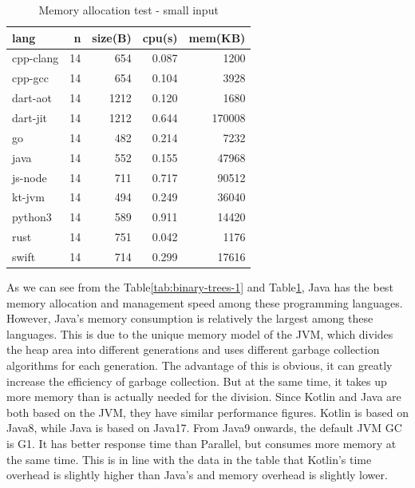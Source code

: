 \begin{table}[htbp]
    \caption{Memory allocation test - small input}
    \label{tab:binary-trees-2}
    \begin{center}
        \begin{tabular}{lrrrr}
            \toprule
            lang      & n  & size(B) & cpu(s) & mem(KB) \\
            \midrule
            cpp-clang & 14 & 654     & 0.087  & 1200    \\
            cpp-gcc   & 14 & 654     & 0.104  & 3928    \\
            dart-aot  & 14 & 1212    & 0.120  & 1680    \\
            dart-jit  & 14 & 1212    & 0.644  & 170008  \\
            go        & 14 & 482     & 0.214  & 7232    \\
            java      & 14 & 552     & 0.155  & 47968   \\
            js-node   & 14 & 711     & 0.717  & 90512   \\
            kt-jvm    & 14 & 494     & 0.249  & 36040   \\
            python3   & 14 & 589     & 0.911  & 14420   \\
            rust      & 14 & 751     & 0.042  & 1176    \\
            swift     & 14 & 714     & 0.299  & 17616   \\
            \bottomrule
        \end{tabular}
    \end{center}
\end{table}

As we can see from the Table\ref{tab:binary-trees-1} and Table\ref{tab:binary-trees-2},
Java has the best memory allocation and management
speed among these programming languages.
However, Java's memory consumption is relatively the largest among these languages.
This is due to the unique memory model of the JVM, which divides the heap area into
different generations and uses different garbage collection algorithms for each generation.
The advantage of this is obvious, it can greatly increase the efficiency of garbage
collection. But at the same time, it takes up more memory than is actually needed for the division.
Since Kotlin and Java are both based on the JVM, they have similar performance figures.
Kotlin is based on Java8, while Java is based on Java17. From Java9 onwards, the default JVM GC is G1.
It has better response time than Parallel, but consumes more memory at the same time.
This is in line with the data in the table that Kotlin's time overhead is slightly higher
than Java's and memory overhead is slightly lower.

